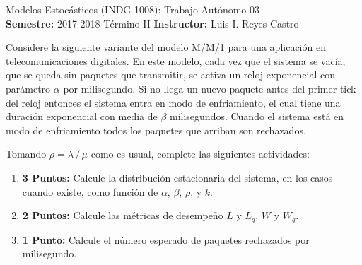 \documentclass[ a4paper, twoside, 11pt]{article}
\newcommand{\numero}{03}
\begin{document}
\allowdisplaybreaks



\begin{center}
\Large Modelos Estoc\'asticos (INDG-1008): Trabajo Aut\'onomo \numero \\[1ex]
\small \textbf{Semestre:} 2017-2018 T\'ermino II \qquad
\textbf{Instructor:} Luis I. Reyes Castro
\end{center}
\fullskip

%
\halfskip

\begin{problem}
\label{prob:enfriamiento}
Considere la siguiente variante del modelo M/M/1 para una aplicaci\'on en telecomunicaciones digitales. En este modelo, cada vez que el sistema se vac\'ia, \ie que se queda sin paquetes que transmitir, se activa un reloj exponencial con par\'ametro $\alpha$ por milisegundo. Si no llega un nuevo paquete antes del primer tick del reloj entonces el sistema entra en modo de enfriamiento, el cual tiene una duraci\'on exponencial con media de $\beta$ milisegundos. Cuando el sistema est\'a en modo de enfriamiento todos los paquetes que arriban son rechazados. 

\begin{figure}[htb]
\centering
\def\svgwidth{0.9\columnwidth}

\end{figure}
\halfskip

Tomando $\rho = \lambda \, / \, \mu$ como es usual, complete las siguientes actividades: 
\begin{enumerate}[label=\textbf{\alph*)}]
\item \textbf{3 Puntos:} Calcule la distribuci\'on estacionaria del sistema, en los casos cuando existe, como funci\'on de $\alpha$, $\beta$, $\rho$, y $k$. 
\item \textbf{2 Puntos:} Calcule las m\'etricas de desempe\~no $L$ y $L_q$, $W$ y $W_q$. 
\item \textbf{1 Punto:} Calcule el n\'umero esperado de paquetes rechazados por milisegundo. 
\end{enumerate}

\end{problem}
\fullskip
\end{document}

